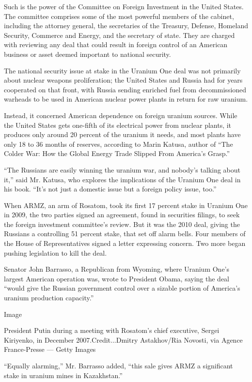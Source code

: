 Such is the power of the Committee on Foreign Investment in the United
States. The committee comprises some of the most powerful members of the
cabinet, including the attorney general, the secretaries of the
Treasury, Defense, Homeland Security, Commerce and Energy, and the
secretary of state. They are charged with reviewing any deal that could
result in foreign control of an American business or asset deemed
important to national security.

The national security issue at stake in the Uranium One deal was not
primarily about nuclear weapons proliferation; the United States and
Russia had for years cooperated on that front, with Russia sending
enriched fuel from decommissioned warheads to be used in American
nuclear power plants in return for raw uranium.

Instead, it concerned American dependence on foreign uranium sources.
While the United States gets one-fifth of its electrical power from
nuclear plants, it produces only around 20 percent of the uranium it
needs, and most plants have only 18 to 36 months of reserves, according
to Marin Katusa, author of ``The Colder War: How the Global Energy Trade
Slipped From America's Grasp.''

``The Russians are easily winning the uranium war, and nobody's talking
about it,'' said Mr. Katusa, who explores the implications of the
Uranium One deal in his book. ``It's not just a domestic issue but a
foreign policy issue, too.''

When ARMZ, an arm of Rosatom, took its first 17 percent stake in Uranium
One in 2009, the two parties signed an agreement, found in securities
filings, to seek the foreign investment committee's review. But it was
the 2010 deal, giving the Russians a controlling 51 percent stake, that
set off alarm bells. Four members of the House of Representatives signed
a letter expressing concern. Two more began pushing legislation to kill
the deal.

Senator John Barrasso, a Republican from Wyoming, where Uranium One's
largest American operation was, wrote to President Obama, saying the
deal ``would give the Russian government control over a sizable portion
of America's uranium production capacity.''

Image

President Putin during a meeting with Rosatom's chief executive, Sergei
Kiriyenko, in December 2007.Credit...Dmitry Astakhov/Ria Novosti, via
Agence France-Presse --- Getty Images

``Equally alarming,'' Mr. Barrasso added, ``this sale gives ARMZ a
significant stake in uranium mines in Kazakhstan.''

